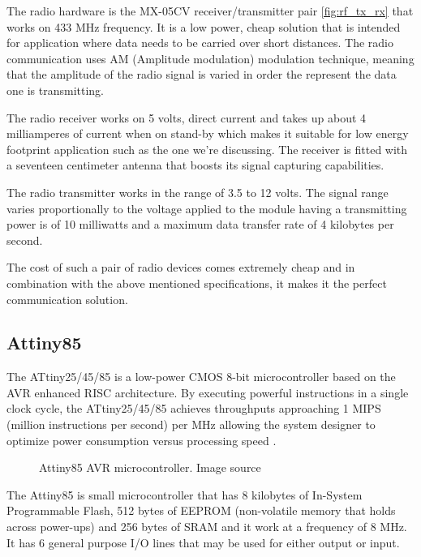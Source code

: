 \qquad The radio hardware is the MX-05CV receiver/transmitter pair \ref{fig:rf_tx_rx} that works on 433 MHz
frequency. It is a low power, cheap solution that is intended for application where data needs to be carried
over short distances. The radio communication uses AM (Amplitude modulation) modulation technique, meaning
that the amplitude of the radio signal is varied in order the represent the data one is transmitting.

\qquad The radio receiver works on 5 volts, direct current and takes up about 4 milliamperes of current when on stand-by
which makes it suitable for low energy footprint application such as the one we're discussing. The receiver is
fitted with a seventeen centimeter antenna that boosts its signal capturing capabilities.

\qquad The radio transmitter works in the range of 3.5 to 12 volts. The signal range  varies proportionally to the
voltage applied to the module having a transmitting power is of 10 milliwatts and a maximum data transfer rate
of 4 kilobytes per second.

The cost of such a pair of radio devices comes extremely cheap and in combination with the above mentioned
specifications, it makes it the perfect communication solution.

\subsection{Attiny85}
\label{sec:attiny85}

\qquad The ATtiny25/45/85 is a low-power CMOS 8-bit microcontroller based on the AVR enhanced RISC architecture. By
executing powerful instructions in a single clock cycle, the ATtiny25/45/85 achieves throughputs approaching 1
MIPS (million instructions per second) per MHz allowing the system designer to optimize power consumption
versus processing speed
\cite{datasheet:attiny85}.

\begin{figure}[h!]
    \label{fig:attiny85}
    \centerline{}
    \caption[Attiny85 AVR microcontroller]{Attiny85 AVR microcontroller. Image source
                                           \cite{website:attiny85pic}}
    \label{fig:attiny85}
\end{figure}


\qquad The Attiny85 is small microcontroller that has 8 kilobytes of In-System Programmable Flash, 512 bytes of
EEPROM (non-volatile memory that holds across power-ups) and 256 bytes of SRAM and it work at a frequency of
8 MHz. It has 6 general purpose I/O lines that may be used for either output or input.

